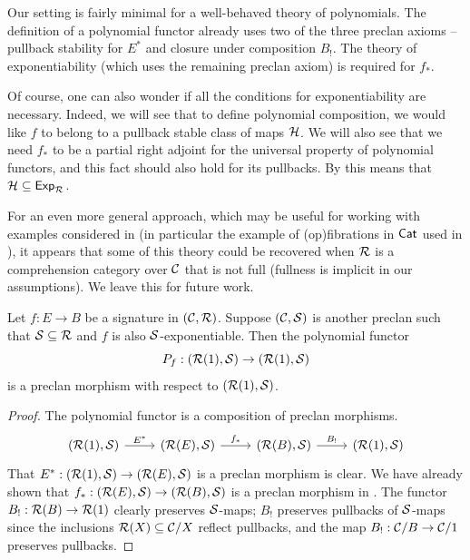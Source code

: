 \begin{remark}
  Our setting is fairly minimal for a well-behaved theory of polynomials.
  The definition of a polynomial functor already uses two of
  the three preclan axioms -- pullback stability for $E^*$ and
  closure under composition $B_!$.
  The theory of exponentiability
  (which uses the remaining preclan axiom)
  is required for $f_*$.

  Of course,
  one can also wonder if all the conditions
  for exponentiability are necessary.
  Indeed,
  we will see that to define polynomial composition,
  we would like $f$ to belong to a pullback stable class of maps $\mathcal{H}$.
  We will also see that we need $f_*$ to be a partial right adjoint
  for the universal property of polynomial functors,
  and this fact should also hold for its pullbacks.
  By 
  this means that $\mathcal{H} \subseteq \mathsf{Exp}_{\mathcal{R}}$.

  For an even more general approach,
  which may be useful for working with examples considered in \cite{anel2024}
  (in particular the example of (op)fibrations in $\mathsf{Cat}$ used in ),
  it appears that some of this theory could be recovered
  when $\mathcal{R}$ is a comprehension category over $\mathcal{C}$ that is not full
  (fullness is implicit in our assumptions).
  We leave this for future work.
\end{remark}

\begin{lemma}\label{lem:polynomial-functor-preserves-maps}
  Let $f : E \to B$ be a signature in $(\mathcal{C},\mathcal{R})$.
  Suppose $(\mathcal{C},\mathcal{S})$ is another preclan such that $\mathcal{S} \subseteq \mathcal{R}$
  and $f$ is also $\mathcal{S}$-exponentiable.
  Then the polynomial functor
  \[ P_f : (\mathcal{R}(1), \mathcal{S}) \to (\mathcal{R}(1), \mathcal{S})\]
  is a preclan morphism with respect to $(\mathcal{R}(1),\mathcal{S})$.
\end{lemma}
\begin{proof}
  The polynomial functor is a composition of preclan morphisms.
  \[\begin{tikzcd}
    {(\RR(1),\SS)} & {(\RR(E),\SS)} & {(\RR(B),\SS)} & {(\RR(1),\SS)}
    \arrow["{{{E^*}}}", from=1-1, to=1-2]
    \arrow["{{{f_*}}}", from=1-2, to=1-3]
    \arrow["{{{B_!}}}", from=1-3, to=1-4]
  \end{tikzcd}\]
  That $E^* : (\mathcal{R}(1),\mathcal{S}) \to (\mathcal{R}(E),\mathcal{S})$ is a preclan morphism is clear.
  We have already shown that $f_* : (\mathcal{R}(E),\mathcal{S}) \to (\mathcal{R}(B),\mathcal{S})$
  is a preclan morphism in .
  The functor $B_! : \mathcal{R}(B) \to \mathcal{R}(1)$ clearly preserves $\mathcal{S}$-maps;
  $B_!$ preserves pullbacks of $\mathcal{S}$-maps since
  the inclusions $\mathcal{R}(X) \subseteq \mathcal{C} / X$ reflect pullbacks,
  and the map $B_! : \mathcal{C} / B \to \mathcal{C} / 1$ preserves pullbacks.
\end{proof}

